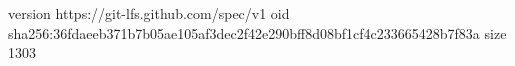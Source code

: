 version https://git-lfs.github.com/spec/v1
oid sha256:36fdaeeb371b7b05ae105af3dec2f42e290bff8d08bf1cf4c233665428b7f83a
size 1303

